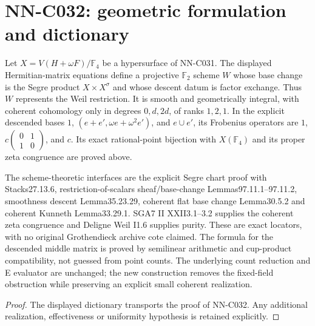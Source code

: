 \section{NN-C032: geometric formulation and dictionary}
\begin{geometricstatement}[NN-C032]
Let $X=V(H+\omega F)/\mathbb F_4$ be a hypersurface of NN-C031. The displayed Hermitian-matrix equations define a projective $\mathbb F_2$ scheme $W$ whose base change is the Segre product $X\times X^\sigma$ and whose descent datum is factor exchange. Thus $W$ represents the Weil restriction. It is smooth and geometrically integral, with coherent cohomology only in degrees $0,d,2d$, of ranks $1,2,1$. In the explicit descended bases $1$, $(e+e',\omega e+\omega^2e')$, and $e\cup e'$, its Frobenius operators are $1$, $c\left(\begin{smallmatrix}0&1\\1&0\end{smallmatrix}\right)$, and $c$. Its exact rational-point bijection with $X(\mathbb F_4)$ and its proper zeta congruence are proved above.

The scheme-theoretic interfaces are the explicit Segre chart proof with Stacks27.13.6, restriction-of-scalars sheaf/base-change Lemmas97.11.1--97.11.2, smoothness descent Lemma35.23.29, coherent flat base change Lemma30.5.2 and coherent Kunneth Lemma33.29.1. SGA7 II XXII3.1--3.2 supplies the coherent zeta congruence and Deligne Weil I1.6 supplies purity. These are exact locators, with no original Grothendieck archive cote claimed. The formula for the descended middle matrix is proved by semilinear arithmetic and cup-product compatibility, not guessed from point counts. The underlying count reduction and E evaluator are unchanged; the new construction removes the fixed-field obstruction while preserving an explicit small coherent realization.
\end{geometricstatement}
\begin{proof} The displayed dictionary transports the proof of NN-C032. Any additional realization, effectiveness or uniformity hypothesis is retained explicitly.\end{proof}


